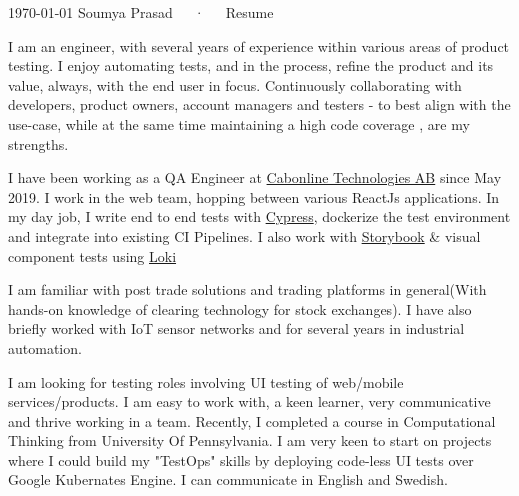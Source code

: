 \documentclass[11pt, a4paper]{awesome-cv}
\begin{document}
\makecvheader

\makecvfooter
  {\today}
  {Soumya Prasad~~~·~~~Resume}
  {\thepage}

\begin{cvparagraph}

  I am an engineer, with several years of experience within various areas of product testing. I enjoy automating tests, and in the process,
refine the product and its value, always, with the end user in focus. Continuously collaborating with developers, product owners,
account managers and testers - to best align with the use-case, while at the same time maintaining a high code coverage , are my strengths.

\hfill \break
I have been working as a QA Engineer at {\href{https://www.cabonline.com/}{\color{cyan}Cabonline Technologies AB}} since May 2019. I work
in the web team, hopping between various ReactJs applications. In my day job, I write end to end tests with {\href{https://www.cypress.io/}{\color{cyan}Cypress}},
dockerize the test environment and integrate into existing CI Pipelines. I also work with {\href{https://storybook.js.org/}{\color{cyan}Storybook}} \& visual component 
tests using {\href{https://loki.js.org/}{\color{cyan}Loki}}

\hfill \break
I am familiar with post trade solutions and
trading platforms in general(With hands-on knowledge of clearing technology for stock exchanges). I have also briefly worked
with IoT sensor networks and for several years in industrial automation.

\hfill \break
I am looking for testing roles involving UI testing of web/mobile services/products. I am easy to work with,
a keen learner, very communicative and thrive working in a team. Recently, I completed a course in Computational Thinking from University Of Pennsylvania.
I am very keen to start on projects where I could build my "TestOps" skills by deploying code-less UI tests over Google Kubernates Engine. 
I can communicate in English and Swedish.

\end{cvparagraph}
\end{document}
